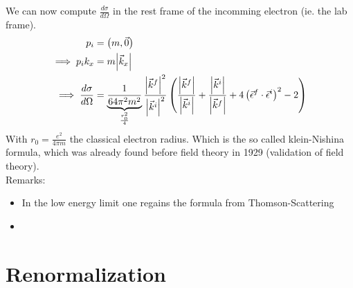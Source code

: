 \documentclass{report}
\begin{document}
We can now compute $\frac{d\sigma}{d\Omega} $ in the rest frame of the incomming electron (ie. the lab frame). 
\begin{align*}
  p_i &= \left( m, \vec{0} \right) \\
  \implies p_i k_x &= m \abs{\vec{k}_x}  \\
  \implies \frac{d\sigma}{d\Omega} &= \underbrace{\frac{1}{64 \pi^2 m^2}}_{\frac{r_0^2}{4} }  \frac{\abs{\vec{k}^{f} } ^2}{\abs{\vec{k}^{i} }^2}  \left( \frac{\abs{\vec{k}^{f} } }{\abs{\vec{k}^{i} } } + \frac{\abs{\vec{k}^{i} } }{\abs{\vec{k}^{f} } } + 4 \left( \vec{\epsilon}^{f} \cdot \vec{\epsilon}^{i}  \right) ^2 - 2 \right) 
\end{align*}
With $r_0 = \frac{e^2}{4\pi m} $ the classical electron radius. Which is the so called klein-Nishina formula, which was already found before field theory in 1929 (validation of field theory).\\
Remarks:\\
\begin{itemize}
  \item In the low energy limit one regains the formula from Thomson-Scattering
  \item 
\end{itemize}
\chapter{Renormalization}
\end{document}
